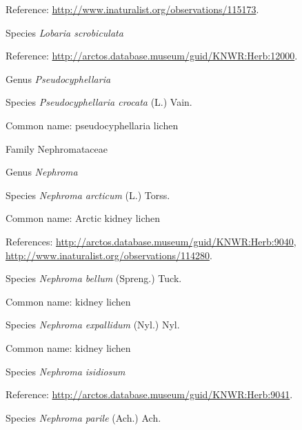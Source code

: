 \documentclass[9pt, article]{memoir}
\begin{document}
\begin{multicols}{2}
Reference: 
\url{http://www.inaturalist.org/observations/115173}.

\vspace{6pt}\noindent\hspace{36pt}Species \textit{Lobaria scrobiculata}


Reference: 
\url{http://arctos.database.museum/guid/KNWR:Herb:12000}.

\vspace{6pt}\noindent\hspace{30pt}Genus \textit{Pseudocyphellaria}


\vspace{6pt}\noindent\hspace{36pt}Species \textit{Pseudocyphellaria crocata} (L.) Vain.


Common name: pseudocyphellaria lichen

\vspace{6pt}\noindent\hspace{24pt}Family Nephromataceae


\vspace{6pt}\noindent\hspace{30pt}Genus \textit{Nephroma}


\vspace{6pt}\noindent\hspace{36pt}Species \textit{Nephroma arcticum} (L.) Torss.


Common name: Arctic kidney lichen

References: 
\url{http://arctos.database.museum/guid/KNWR:Herb:9040}, 
\url{http://www.inaturalist.org/observations/114280}.

\vspace{6pt}\noindent\hspace{36pt}Species \textit{Nephroma bellum} (Spreng.) Tuck.


Common name: kidney lichen

\vspace{6pt}\noindent\hspace{36pt}Species \textit{Nephroma expallidum} (Nyl.) Nyl.


Common name: kidney lichen

\vspace{6pt}\noindent\hspace{36pt}Species \textit{Nephroma isidiosum}


Reference: 
\url{http://arctos.database.museum/guid/KNWR:Herb:9041}.

\vspace{6pt}\noindent\hspace{36pt}Species \textit{Nephroma parile} (Ach.) Ach.



\end{multicols}
\end{document}
